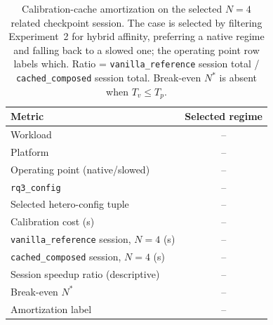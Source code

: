 \begin{table}[H]
  \caption{Calibration-cache amortization on the selected $N=4$
           related checkpoint session. The case is selected by
           filtering Experiment~2 for hybrid affinity,
           preferring a native regime and falling back to a
           slowed one; the operating point row labels which.
           Ratio =
           \texttt{vanilla\_reference} session total /
           \texttt{cached\_composed} session total.
           Break-even $N^{*}$ is absent when
           $T_v \le T_p$.}
  \label{tab:calib}
  \centering
  \begin{tabular}{lc}
    \toprule
    Metric & Selected regime \\
    \midrule
    Workload                                        & -- \\
    Platform                                        & -- \\
    Operating point (native/slowed)                 & -- \\
    \texttt{rq3\_config}                    & -- \\
    Selected hetero-config tuple                    & -- \\
    Calibration cost (s)                            & -- \\
    \midrule
    \texttt{vanilla\_reference} session, $N=4$ (s)  & -- \\
    \texttt{cached\_composed} session, $N=4$ (s)    & -- \\
    \midrule
    Session speedup ratio (descriptive)             & -- \\
    Break-even $N^{*}$                              & -- \\
    Amortization label                              & -- \\
    \bottomrule
  \end{tabular}
\end{table}
